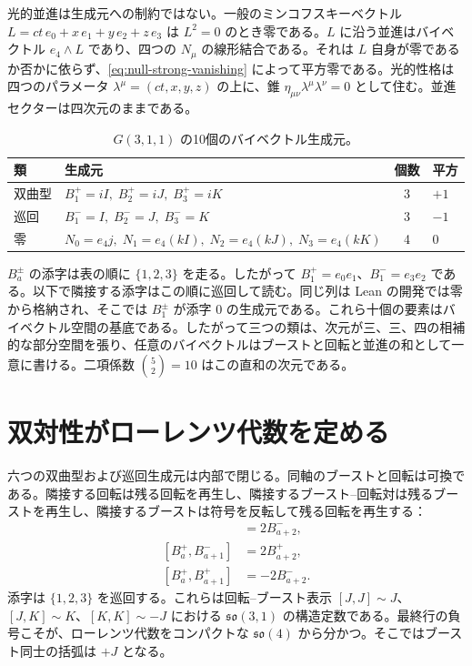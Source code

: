 \documentclass[a4paper]{article}
\begin{document}
光的並進は生成元への制約ではない。一般のミンコフスキーベクトル \(L=ct\,e_{0}+x\,e_{1}+y\,e_{2}+z\,e_{3}\) は \(L^{2}=0\) のとき零である。\(L\) に沿う並進はバイベクトル \(e_{4}\wedge L\) であり、四つの \(N_{\mu}\) の線形結合である。それは \(L\) 自身が零であるか否かに依らず、\eqref{eq:null-strong-vanishing} によって平方零である。光的性格は四つのパラメータ \(\lambda^{\mu}=(ct,x,y,z)\) の上に、錐 \(\eta_{\mu\nu}\lambda^{\mu}\lambda^{\nu}=0\) として住む。並進セクターは四次元のままである。

\begin{table}[htbp]
\centering
\caption{\(G(3,1,1)\) の10個のバイベクトル生成元。}
\label{tab:generators}
\begin{tabular}{llcl}
\hline
類     & 生成元 & 個数 & 平方 \\
\hline
双曲型 & \(B_{1}^{+}=iI,\; B_{2}^{+}=iJ,\; B_{3}^{+}=iK\) & 3 & \(+1\) \\
巡回   & \(B_{1}^{-}=I,\; B_{2}^{-}=J,\; B_{3}^{-}=K\)     & 3 & \(-1\) \\
零     & \(N_{0}=e_{4}j,\; N_{1}=e_{4}(kI),\; N_{2}=e_{4}(kJ),\; N_{3}=e_{4}(kK)\) & 4 & \(0\) \\
\hline
\end{tabular}
\end{table}

\(B_{a}^{\pm}\) の添字は表の順に \(\{1,2,3\}\) を走る。したがって \(B_{1}^{+}=e_{0}e_{1}\)、\(B_{1}^{-}=e_{3}e_{2}\) である。以下で隣接する添字はこの順に巡回して読む。同じ列は Lean の開発では零から格納され、そこでは \(B_{1}^{\pm}\) が添字 \(0\) の生成元である。これら十個の要素はバイベクトル空間の基底である。したがって三つの類は、次元が三、三、四の相補的な部分空間を張り、任意のバイベクトルはブーストと回転と並進の和として一意に書ける。二項係数 \(\binom{5}{2}=10\) はこの直和の次元である。

\section{双対性がローレンツ代数を定める}
\label{sec:duality}

六つの双曲型および巡回生成元は内部で閉じる。同軸のブーストと回転は可換である。隣接する回転は残る回転を再生し、隣接するブースト--回転対は残るブーストを再生し、隣接するブーストは符号を反転して残る回転を再生する：
\begin{align*}
[B^{-}_{a},B^{-}_{a+1}] &= 2B^{-}_{a+2},\\
[B^{+}_{a},B^{-}_{a+1}] &= 2B^{+}_{a+2},\\
[B^{+}_{a},B^{+}_{a+1}] &= -2B^{-}_{a+2}.
\end{align*}
添字は \(\{1,2,3\}\) を巡回する。これらは回転--ブースト表示 \([J,J]\sim J\)、\([J,K]\sim K\)、\([K,K]\sim -J\) における \(\mathfrak{so}(3,1)\) の構造定数である。最終行の負号こそが、ローレンツ代数をコンパクトな \(\mathfrak{so}(4)\) から分かつ。そこではブースト同士の括弧は \(+J\) となる。
\end{document}
